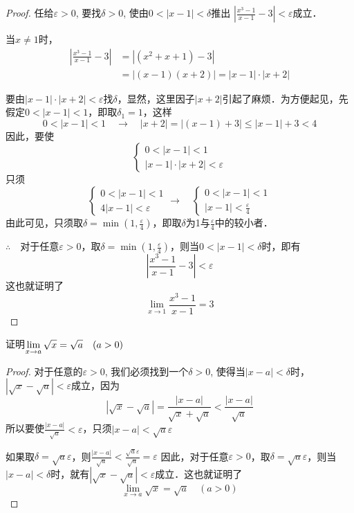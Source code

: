 \begin{proof}
    任给$\varepsilon>0$, 要找$\delta>0$, 使由$0<|x-1|<\delta$推出
    $\left|\frac{x^3-1}{x-1}-3\right|<\varepsilon$成立．

    当$x\ne 1$时，
\[\begin{split}
    \left|\frac{x^3-1}{x-1}-3\right|&=|(x^2+x+1)-3|\\
    &=|(x-1)(x+2)|=|x-1|\cdot |x+2|
\end{split}\]

要由$|x-1|\cdot |x+2|<\varepsilon$找$\delta$，显然，这里因子$|x+2|$引起了麻烦．为方便起见，先假定$0<|x-1|<1$，即取$\delta_1=1$，这样
\[0<|x-1|<1\quad\to \quad |x+2|=|(x-1)+3|\le |x-1|+3<4\]因此，要使
\[\begin{cases}
    0<|x-1|<1\\
    |x-1|\cdot |x+2|<\varepsilon
\end{cases}\]
只须
\[\begin{cases}
    0<|x-1|<1\\
    4|x-1|<\varepsilon
\end{cases}\to \quad \begin{cases}
    0<|x-1|<1\\
    |x-1|<\frac{\varepsilon}{4}
\end{cases}\]
由此可见，只须取$\delta=\min\left(1,\frac{\varepsilon}{4}\right)$，即取$\delta$为1与$\frac{\varepsilon}{4}$中的较小者．

$\therefore\quad $对于任意$\varepsilon>0$，取$\delta=\min\left(1,\frac{\varepsilon}{4}\right)$，则当$0<|x-1|<\delta$时，即有
\[\left|\frac{x^3-1}{x-1}-3\right|<\varepsilon\]
这也就证明了
\[\lim_{x\to 1}\frac{x^3-1}{x-1}=3\]
\end{proof}

\begin{example}
    证明$\displaystyle\lim_{x\to a}\sqrt{x}=\sqrt{a}\quad (a>0)$
\end{example}

\begin{proof}
对于任意的$\varepsilon>0$, 我们必须找到一个$\delta>0$, 使得当$|x-a|<\delta$时，$|\sqrt{x}-\sqrt{a}|<\varepsilon$成立，因为
\[|\sqrt{x}-\sqrt{a}|=\frac{|x-a|}{\sqrt{x}+\sqrt{a}}<\frac{|x-a|}{\sqrt{a}}\]
所以要使$\frac{|x-a|}{\sqrt{a}}<\varepsilon$，只须$|x-a|<\sqrt{a}\varepsilon$

如果取$\delta=\sqrt{a}\varepsilon$，则$\frac{|x-a|}{\sqrt{a}}<\frac{\sqrt{a}\varepsilon}{\sqrt{a}}=\varepsilon$
因此，对于任意$\varepsilon>0$，取$\delta=\sqrt{a}\varepsilon$，则当$|x-a|<\delta$时，就有$|\sqrt{x}-\sqrt{a}|<\varepsilon$成立．这也就证明了
\[\lim_{x\to a}\sqrt{x}=\sqrt{a}\quad (a>0)\]
\end{proof}

